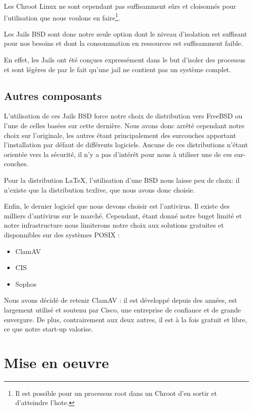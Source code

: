 \documentclass[10pt,a4paper]{article}
\begin{document}
Les Chroot Linux ne sont cependant pas suffisamment sûrs et cloisonnés pour l'utilisation que nous voulons en faire\footnote{Il est possible pour un processus root dans un Chroot d'en sortir et d'atteindre l'hote.}.

Les Jails BSD sont donc notre seule option dont le niveau d'isolation est suffisant pour nos besoins et dont la consommation en ressources est suffisamment faible.

En effet, les Jails ont été conçues expressément dans le but d'isoler des processus et sont légères de par le fait qu'une jail ne contient pas un système complet.

\subsection{Autres composants}
L'utilisation de ces Jails BSD force notre choix de distribution vers FreeBSD ou l'une de celles basées sur cette dernière. Nous avons donc arrêté cependant notre choix sur l'originale, les autres étant principalement des surcouches apportant l'installation par défaut de différents logiciels. Aucune de ces distributions n'étant orientée vers la sécurité, il n'y a pas d'intérêt pour nous à utiliser une de ces sur-couches.

Pour la distribution \LaTeX, l'utilisation d'une BSD nous laisse peu de choix: il n'existe que la distribution texlive, que nous avons donc choisie.

Enfin, le dernier logiciel que nous devons choisir est l'antivirus. Il existe des milliers d'antivirus sur le marché. Cependant, étant donné notre buget limité et notre infrastructure nous limiterons notre choix aux solutions gratuites et disponnibles sur des systèmes POSIX :
\begin{itemize}
    \item{ClamAV}
    \item{CIS}
    \item{Sophos}
\end{itemize}


Nous avons décidé de retenir ClamAV : il est développé depuis des années, est largement utilisé et soutenu par Cisco, une entreprise de confiance et de grande envergure. De plus, contrairement aux deux autres, il est à la fois gratuit et libre, ce que notre start-up valorise.

\section{Mise en oeuvre}
\end{document}
